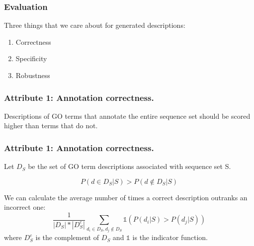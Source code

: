 \documentclass{beamer}
\begin{document}
\begin{frame}
\frametitle{Evaluation}
Three things that we care about for generated descriptions:
\begin{enumerate}
    \item Correctness\pause
    \item Specificity\pause
    \item Robustness

\end{enumerate}
\end{frame}

\begin{frame}
    \frametitle{Attribute 1: Annotation correctness.}
        Descriptions of GO terms that annotate the entire sequence set should be scored higher than terms that do not.
\end{frame}

\begin{frame}
    \frametitle{Attribute 1: Annotation correctness.}

            Let $D_{S}$ be the set of GO term descriptions associated with sequence set S.\pause

            \[P(d \in D_{S} | S) > P(d \notin D_{S} | S)\]\pause

                We can calculate the average number of times a correct description outranks an incorrect one:
        \[\frac{1}{|D_{S}|*|D_{S}^{c}|}\sum_{d_i \in D_{S}, d_j \notin D_{S}} \mathds{1}(P(d_i | S) > P(d_j | S))\]
        where $D_{S}^{c}$ is the complement of $D_{S}$ and $\mathds{1}$ is the indicator function.

\end{frame}
\end{document}
